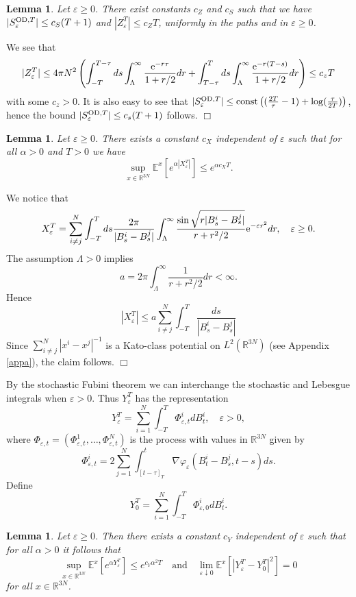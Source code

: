 \documentclass[12pt]{article}
\newtheorem{lemma}[theorem]{Lemma}
\newcommand{\bl}[1]{\begin{lemma}\label{#1}}
\newcommand{\el}{\end{lemma}}
\newcommand{\Ebb}{{\mathbb E}}
\providecommand{\eq}[1]{\begin{equation}\label{#1}}
\providecommand{\en}{\end{equation}}
\renewcommand{\d}{\displaystyle}
\providecommand{\qed}{\hfill {$\Box$}\par\medskip}
\providecommand{\BRN}{{\mathbb{R}^{3N} }}
\renewcommand{\ij}{\sum_{i\not=j}^N}
\providecommand{\od}{{\rm OD}}
\providecommand{\RR}{\mathbb{R}}
\providecommand{\lk}{\left(}
\providecommand{\rk}{\right)}
\providecommand{\e}{{\rm e}}
\providecommand{\1}{\mathbb{1}}
\providecommand{\eps}{\varepsilon}
\newcounter {constant}
\begin{document}
\bl{finitez}
Let $\eps\geq0$.
There exist constants $c_Z$ and $c_S$ such that we have $|S_\eps^{\od,T}|\leq c_S (T+1)$
and $|Z_\eps^T|\leq c_Z T$, uniformly in the paths and in $\eps\geq0$.
\el
\proof
We see that
\begin{align*}
|Z^T_\eps| \leq
4\pi N^2 \lk \int_{-T}^{T-\tau} ds  \int_{\Lambda}^\infty \frac{\e^{-r\tau }}{1+r/2}dr +
\int_{T-\tau}^{T} ds  \int_{\Lambda}^\infty \frac{\e^{-r(T-s)}}{1+r/2}dr\rk \leq c_z T
\end{align*}
with some $c_z > 0$. It is also easy to see that $|S_\eps^{\od,T}|\leq {\rm const} \lk 
(\frac{2T}{\tau}-1)+\log(\frac{\tau}{2T})\rk$, hence the bound $|S_\eps^{\od,T}|\leq c_s (T+1)$ 
follows.
\qed
\bl{finite}
Let $\eps\geq0$. There exists a  constant $c_X$ independent of $\eps$ such that for all 
$\alpha >0$ and $T>0$ we have
$$
\d \sup_{x\in\BRN} \Ebb^x[e^{\alpha|X^T_\eps|}]\le e^{\alpha c_X T}.
$$
 \el
\proof
We notice that
\eq{225}
X_\eps^T =\ij\int_{-T}^ T ds \frac{2\pi}{|B_s^i-B_s^j|}
\int_\Lambda^\infty \frac{\sin\sqrt{r|B_s^i-B_s^j|}}{r+r^2/2}\e^{-\eps r^2} dr,\quad \eps\geq0.
\en
The assumption $\Lambda>0$ implies
\eq{IRbound}
a=2 \pi \int_\Lambda^\infty \frac{1}{r+r^2/2} dr<\infty.
\en
Hence
\eq{xkato}
|X^T_\eps| \leq a \ij\int_{-T}^ {T}  \frac{ds}{|B_s^i-B_s^j|}
\en
Since $\ij |x^i-x^j|^{-1}$  is a Kato-class potential on $L^2(\RR^{3N})$ (see Appendix \ref{appa}),
the claim follows.
\qed
By the stochastic Fubini theorem we can interchange the stochastic and Lebesgue integrals when $\eps>0$. 
Thus $Y^T_\eps$ has the representation
\begin{equation}
\label{eq:WI-renorm-1-bis}
Y_\eps^T  = \sum_{i=1}^N \int_{-T}^T \Phi^i_{\eps,t} dB_t^i,\quad \eps>0,
\end{equation}
where $\Phi_{\eps,t}=(\Phi^1_{\eps,t},\dots,\Phi^N_{\eps,t})$ is the process with values in $\BRN$ 
given by
$$
\Phi^i_{\eps,t} = 2 \sum_{j=1}^N \int_{[t-\tau]_T}^t  \nabla \varphi_\eps(B_t^i-B_s^j,t-s) ds.
$$
Define
\begin{equation}
\label{eq:WI-renorm-1-biss}
Y_0^T  = \sum_{i=1}^N \int_{-T}^T \Phi^i_{\eps,0} dB_t^i.
\end{equation}
\begin{lemma}
\label{prop:convergence}
Let $\eps\geq0$. Then there exists a  constant $c_Y$ independent of $\eps$ such that for all $\alpha >0$
it follows that 
$$
\d \sup_{x\in\BRN} \d \Ebb^x [e^{\alpha Y^T_\eps}]\le e^{c_Y\alpha^2 T} \quad \mbox{and} \quad
\d \lim_{\eps\downarrow0}\Ebb^x [|Y^T_\eps -Y_0^T |^2]=0
$$
for all $x\in\BRN$.
\end{lemma}
\end{document}
